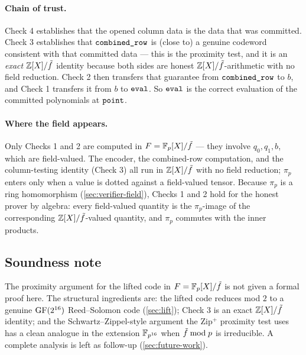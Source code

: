 \paragraph{Chain of trust.}
Check 4 establishes that the opened column data is the data that was
committed. Check 3 establishes that $\texttt{combined\_row}$ is (close
to) a genuine codeword consistent with that committed data --- this is
the proximity test, and it is an \emph{exact} $\mathbb{Z}[X]/\tilde f$ identity
because both sides are honest $\mathbb{Z}[X]/\tilde f$-arithmetic with no field
reduction. Check 2 then transfers that guarantee from
$\texttt{combined\_row}$ to $b$, and Check 1 transfers it from $b$ to
$\texttt{eval}$. So $\texttt{eval}$ is the correct evaluation of the
committed polynomials at $\texttt{point}$.

\paragraph{Where the field appears.}
Only Checks 1 and 2 are computed in $F = \mathbb{F}_p[X]/\tilde f$ --- they
involve $q_0, q_1, b$, which are field-valued. The encoder, the
combined-row computation, and the column-testing identity (Check 3)
all run in $\mathbb{Z}[X]/\tilde f$ with no field reduction; $\pi_p$ enters only when
a  value is dotted against a field-valued tensor. Because
$\pi_p$ is a ring homomorphism (\autoref{sec:verifier-field}), Checks
1 and 2 hold for the honest prover by algebra: every field-valued
quantity is the $\pi_p$-image of the corresponding $\mathbb{Z}[X]/\tilde f$-valued
quantity, and $\pi_p$ commutes with the inner products.

\subsection{Soundness note}

The proximity argument for the lifted code in $F = \mathbb{F}_p[X]/\tilde f$ is
not given a formal proof here. The structural ingredients are: the
lifted code reduces mod $2$ to a genuine $\operatorname{GF}(2^{16})$ Reed--Solomon
code (\autoref{sec:lift}); Check 3 is an exact $\mathbb{Z}[X]/\tilde f$ identity; and
the Schwartz--Zippel-style argument the Zip$^+$ proximity test uses
has a clean analogue in the extension $\mathbb{F}_{p^{16}}$ when $\tilde f \bmod
p$ is irreducible. A complete analysis is left as follow-up
(\autoref{sec:future-work}).
